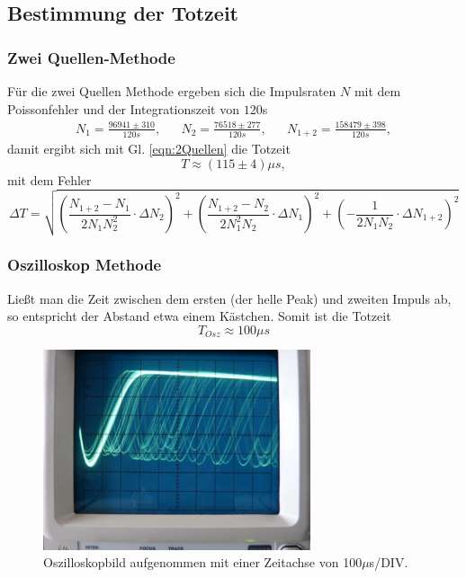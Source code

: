 \subsection{Bestimmung der Totzeit}
\subsubsection*{Zwei Quellen-Methode}
Für die zwei Quellen Methode ergeben sich die Impulsraten $N$ mit dem Poissonfehler und
der Integrationszeit von $120$s
\begin{align*}
    N_1=\frac{96941\pm310}{120\si{s}}, && N_2=\frac{76518\pm277}{120\si{s}}, && N_{1+2}=\frac{158479\pm398}{120\si{s}},
\end{align*} 
damit ergibt sich mit Gl. \ref{eqn:2Quellen} die Totzeit
\begin{equation}
    T \approx (115\pm4)\si{\mu s},
\end{equation}
mit dem Fehler
\begin{equation*}
    \Delta T = \sqrt{\left(\frac{N_{1+2}-N_1}{2N_1N_2^2}\cdot \Delta N_2\right)^2+\left(\frac{N_{1+2}-N_2}{2N_1^2N_2}\cdot \Delta N_1\right)^2+\left(-\frac{1}{2N_1N_2}\cdot \Delta N_{1+2}\right)^2}
\end{equation*}
\subsubsection*{Oszilloskop Methode}
Ließt man die Zeit zwischen dem ersten (der helle Peak) und zweiten Impuls ab, so 
entspricht der Abstand etwa einem Kästchen. Somit ist die Totzeit
\begin{equation*}
    T_{Osz}\approx 100\mu s
\end{equation*}
\begin{figure}
    \centering
    \includegraphics[width=0.7\textwidth]{input/oszilloskop.jpg}
    \caption{Oszilloskopbild aufgenommen mit einer Zeitachse von 100$\mu$s/DIV.}
\end{figure}
